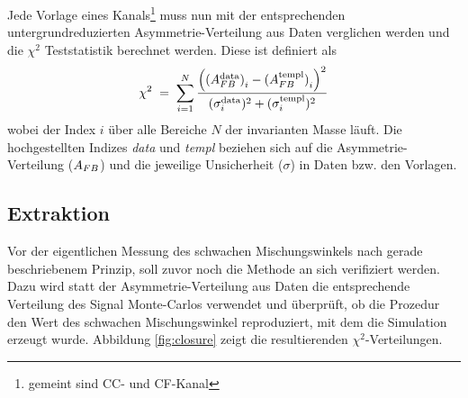 Jede Vorlage eines Kanals\footnote{gemeint sind \ac{CC}- und \ac{CF}-Kanal}
muss nun mit der entsprechenden untergrundreduzierten Asymmetrie-Verteilung aus
Daten verglichen werden und die $\chi^2$ Teststatistik berechnet werden. Diese
ist definiert als
\begin{equation}
    \chi^2 \;=\; \sum_{i=1}^{N}
        \frac{
            \left(
                {(A_{FB}^\text{data})}_i - {(A_{FB}^\text{templ})}_i
            \right)^2
        }{
            (\sigma_i^\text{data})^2 + (\sigma_i^\text{templ})^2
        }
\end{equation}
wobei der Index $i$ über alle Bereiche $N$ der invarianten Masse läuft. Die
hochgestellten Indizes \textit{data} und \textit{templ} beziehen sich auf die
Asymmetrie-Verteilung ($A_{FB}$) und die jeweilige Unsicherheit ($\sigma$) in
Daten bzw. den Vorlagen.



\subsection{Extraktion}
\label{afb:extraction}


Vor der eigentlichen Messung des schwachen Mischungswinkels nach gerade
beschriebenem Prinzip, soll zuvor noch die Methode an sich verifiziert werden.
Dazu wird statt der Asymmetrie-Verteilung aus Daten die entsprechende
Verteilung des Signal Monte-Carlos verwendet und überprüft, ob die Prozedur den
Wert des schwachen Mischungswinkel reproduziert, mit dem die Simulation erzeugt
wurde. Abbildung \ref{fig:closure} zeigt die resultierenden
$\chi^2$-Verteilungen.


